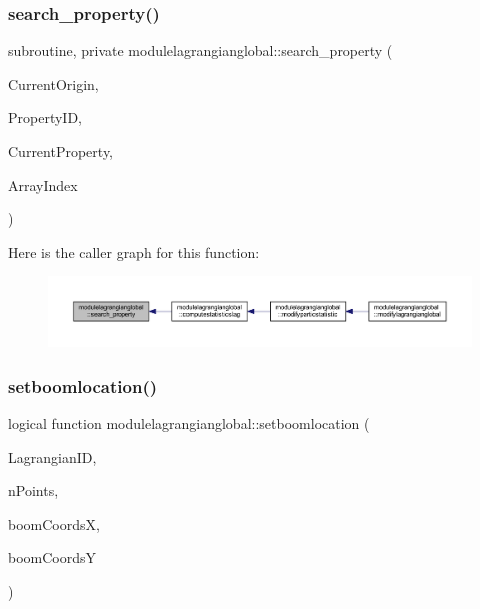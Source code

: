 \subsubsection{\texorpdfstring{search\+\_\+property()}{search\_property()}}
{\footnotesize\ttfamily subroutine, private modulelagrangianglobal\+::search\+\_\+property (\begin{DoxyParamCaption}\item[{type(\mbox{\hyperlink{structmodulelagrangianglobal_1_1t__origin}{t\+\_\+origin}}), pointer}]{Current\+Origin,  }\item[{integer, intent(in)}]{Property\+ID,  }\item[{type(\mbox{\hyperlink{structmodulelagrangianglobal_1_1t__property}{t\+\_\+property}}), pointer}]{Current\+Property,  }\item[{integer, intent(out), optional}]{Array\+Index }\end{DoxyParamCaption})\hspace{0.3cm}{\ttfamily [private]}}

Here is the caller graph for this function\+:\nopagebreak
\begin{figure}[H]
\begin{center}
\leavevmode
\includegraphics[width=350pt]{namespacemodulelagrangianglobal_a8101ab80f9478c6164ad8c0d0261efd1_icgraph}
\end{center}
\end{figure}
\mbox{\label{namespacemodulelagrangianglobal_a026e5461ba329b59c22df0570d3c4cd4}} 
\subsubsection{\texorpdfstring{setboomlocation()}{setboomlocation()}}
{\footnotesize\ttfamily logical function modulelagrangianglobal\+::setboomlocation (\begin{DoxyParamCaption}\item[{integer}]{Lagrangian\+ID,  }\item[{integer}]{n\+Points,  }\item[{real(8), dimension(npoints)}]{boom\+CoordsX,  }\item[{real(8), dimension(npoints)}]{boom\+CoordsY }\end{DoxyParamCaption})\hspace{0.3cm}{\ttfamily [private]}}

